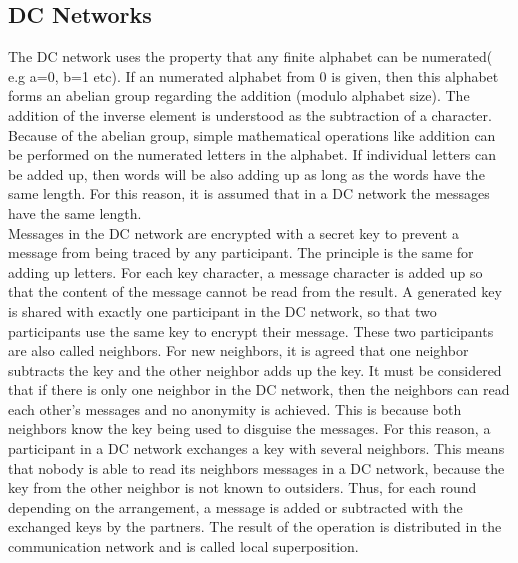 \subsection{DC Networks}
The DC network uses the property that any finite alphabet can be numerated( e.g a=0, b=1 etc). If an numerated alphabet from 0 is given, then this alphabet forms an abelian group regarding the addition (modulo alphabet size). The addition of the inverse element is understood as the subtraction of a character. Because of the abelian group, simple mathematical operations like addition can be performed on the numerated letters in the alphabet. 
If individual letters can be added up, then words will be also adding up as long as the words have the same length. For this reason, it is assumed that in a DC network the messages have the same length.\\
Messages in the DC network are encrypted with a secret key to prevent a message from being traced by any participant. The principle is the same for adding up letters. For each key character, a message character is added up so that the content of the message cannot be read from the result. A generated key is shared with exactly one participant in the DC network, so that two participants use the same key to encrypt their message. These two participants are also called neighbors. For new neighbors, it is agreed that one neighbor subtracts the key and the other neighbor adds up the key. It must be considered that if there is only one neighbor in the DC network, then the neighbors can read each other's messages and no anonymity is achieved. This is because both neighbors know the key being used to disguise the messages. For this reason, a participant in a DC network exchanges a key with several neighbors. This means that nobody is able to read its neighbors messages in a DC network, because the key from the other neighbor is not known to outsiders. Thus, for each round depending on the arrangement, a message is added or subtracted with the exchanged keys by the partners. The result of the operation is distributed in the communication network and is called local superposition. 
